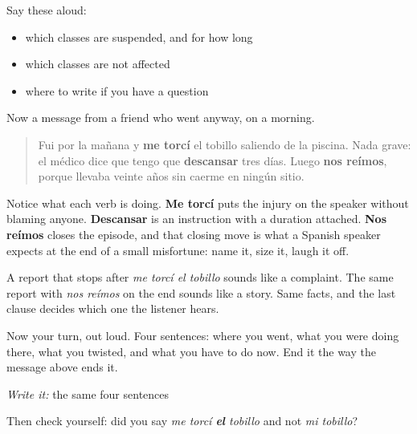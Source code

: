 Say these aloud:

\begin{itemize}
\raggedright
  \item which classes are suspended, and for how long
  \item which classes are not affected
  \item where to write if you have a question
\end{itemize}

\begin{culture}
Now a message from a friend who went anyway, on a morning.

\begin{quote}
Fui por la mañana y \textbf{me torcí} el tobillo saliendo de la piscina. Nada grave: el médico dice que tengo que \textbf{descansar} tres días. Luego \textbf{nos reímos}, porque llevaba veinte años sin caerme en ningún sitio.
\end{quote}

Notice what each verb is doing. \textbf{Me torcí} puts the injury on the speaker without blaming anyone. \textbf{Descansar} is an instruction with a duration attached. \textbf{Nos reímos} closes the episode, and that closing move is what a Spanish speaker expects at the end of a small misfortune: name it, size it, laugh it off.

A report that stops after \emph{me torcí el tobillo} sounds like a complaint. The same report with \emph{nos reímos} on the end sounds like a story. Same facts, and the last clause decides which one the listener hears.
\end{culture}

\begin{tcolorbox}[breakable,colback=teal!4,colframe=teal!35!black,title={Before you move on}]
Now your turn, out loud. Four sentences: where you went, what you were doing there, what you twisted, and what you have to do now. End it the way the message above ends it.

\emph{Write it:} the same four sentences

Then check yourself: did you say \emph{me torcí \textbf{el} tobillo} and not \emph{mi tobillo}?
\end{tcolorbox}
